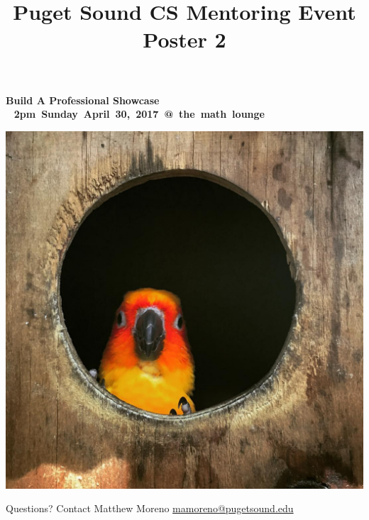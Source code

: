 \documentclass[12pt,letterpaper]{article}
\title{Puget Sound CS Mentoring Event Poster 2}
\begin{document}
{\fontsize{40pt}{42pt}\bfseries\selectfont\color{HighlightColor}%
Build A Professional Showcase
\\}%
~\hfill
{\LARGE\bfseries%
\mbox{2pm Sunday April 30, 2017 @ the math lounge}%
}


%

{\centering%
\includegraphics[width=0.93\linewidth,trim={3cm 5cm 5cm 3cm}, clip]{hello_bird}%
\par}


\vspace{-3ex}
\begin{large}
\justify
{ \par}

\end{large}



{\LARGE Questions?}
\hfill
{\Large Contact Matthew Moreno \url{mamoreno@pugetsound.edu}}
\end{document}

